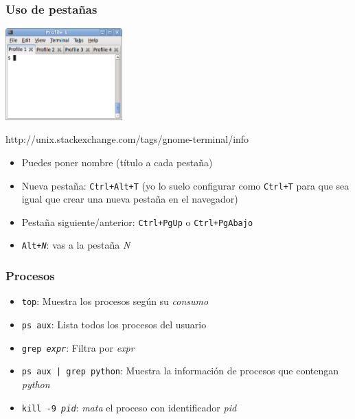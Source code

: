 \begin{frame}
\frametitle{Uso de pestañas}

\begin{center}
  \includegraphics[width=4.5cm]{figs/tabs.png}
\end{center}


\begin{flushright}
{\tiny
http://unix.stackexchange.com/tags/gnome-terminal/info
}
\end{flushright}


\begin{itemize}
   \item Puedes poner nombre (título a cada pestaña)
   \item Nueva pestaña: \texttt{Ctrl+Alt+T} (yo lo suelo configurar como \texttt{Ctrl+T} para que sea igual que crear una nueva pestaña en el navegador)
   \item Pestaña siguiente/anterior: \texttt{Ctrl+PgUp} o \texttt{Ctrl+PgAbajo}
   \item \texttt{Alt+\emph{N}}: vas a la pestaña \emph{N}
\end{itemize}


\end{frame}



\begin{frame}
\frametitle{Procesos}

\begin{itemize}
   \item \texttt{top}: Muestra los procesos según su \emph{consumo}
   \item \texttt{ps aux}: Lista todos los procesos del usuario
   \item \texttt{grep \emph{expr}}: Filtra por \emph{expr} 
   \item \texttt{ps aux | grep python}: Muestra la información de procesos que contengan \emph{python}
   \item \texttt{kill -9 \emph{pid}}: \emph{mata} el proceso con identificador \emph{pid}
\end{itemize}


\end{frame}


